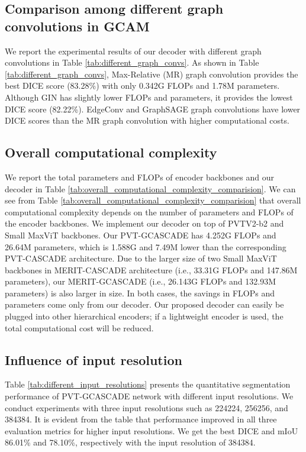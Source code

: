 \documentclass[10pt,twocolumn,letterpaper]{article}
\begin{document}
\subsection{Comparison among different graph convolutions in GCAM}
We report the experimental results of our decoder with different graph convolutions in Table \ref{tab:different_graph_convs}. As shown in Table \ref{tab:different_graph_convs}, Max-Relative (MR) \cite{li2019deepgcns} graph convolution provides the best DICE score (83.28\%) with only 0.342G FLOPs and 1.78M parameters. Although GIN \cite{xu2018powerful} has slightly lower FLOPs and parameters, it provides the lowest DICE score (82.22\%).
EdgeConv \cite{wang2019dynamic} and GraphSAGE \cite{hamilton2017inductive} graph convolutions have lower DICE scores than the MR graph convolution with higher computational costs.

\color{black}
\subsection{Overall computational complexity}
We report the total parameters and FLOPs of encoder backbones and our decoder in Table \ref{tab:overall_computational_complexity_comparision}. We can see from Table \ref{tab:overall_computational_complexity_comparision} that overall computational complexity depends on the number of parameters and FLOPs of the encoder backbones. We implement our decoder on top of PVTV2-b2 \cite{wang2022pvt} and Small MaxViT \cite{tu2022maxvit} backbones. Our PVT-GCASCADE has 4.252G FLOPs and 26.64M parameters, which is 1.588G and 7.49M lower than the corresponding PVT-CASCADE architecture. Due to the larger size of two Small MaxViT backbones in MERIT-CASCADE architecture (i.e., 33.31G FLOPs and 147.86M parameters), our MERIT-GCASCADE (i.e., 26.143G FLOPs and 132.93M parameters) is also larger in size. In both cases, the savings in FLOPs and parameters come only from our decoder. Our proposed decoder can easily be plugged into other hierarchical encoders; if a lightweight encoder is used, the total computational cost will be reduced.
\color{black}

\subsection{Influence of input resolution}

Table \ref{tab:different_input_resolutions} presents the quantitative segmentation performance of PVT-GCASCADE network with different input resolutions. We conduct experiments with three input resolutions such as 224224, 256256, and 384384. It is evident from the table that performance improved in all three evaluation metrics for higher input resolutions. We get the best DICE and mIoU  86.01\% and 78.10\%, respectively with the input resolution of 384384.  
\end{document}
